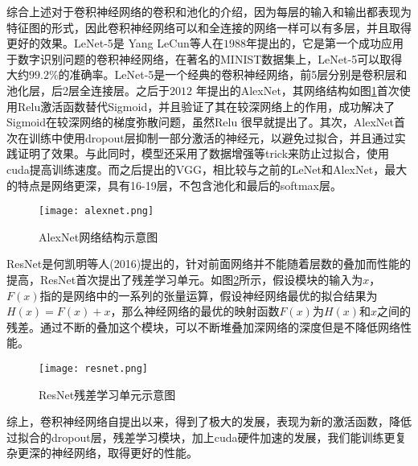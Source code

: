 综合上述对于卷积神经网络的卷积和池化的介绍，因为每层的输入和输出都表现为特征图的形式，因此卷积神经网络可以和全连接的网络一样可以有多层，并且取得更好的效果。LeNet-5\cite{lecun1998gradient-based}是
Yang LeCun等人在$1988$年提出的，它是第一个成功应用于数字识别问题的卷积神经网络，在著名的MINIST数据集上，LeNet-5可以取得大约$99.2\%$的准确率。LeNet-5是一个经典的卷积神经网络，前5层分别是卷积层和池化层，后2层全连接层。之后于$2012$ 年提出的AlexNet\cite{krizhevsky2012imagenet}，其网络结构如图\ref{fig:alexnet-example}首次使用Relu激活函数替代Sigmoid，并且验证了其在较深网络上的作用，成功解决了Sigmoid在较深网络的梯度弥散问题，虽然Relu 很早就提出了。其次，AlexNet首次在训练中使用dropout层抑制一部分激活的神经元，以避免过拟合，并且通过实践证明了效果。与此同时，模型还采用了数据增强等trick来防止过拟合，使用cuda提高训练速度。而之后提出的VGG\cite{simonyan2015very}，相比较与之前的LeNet和AlexNet，最大的特点是网络更深，具有16-19层，不包含池化和最后的softmax层。
\begin{figure}[htpb]
	\centering
	\texttt{[image: alexnet.png]}
    \caption{AlexNet网络结构示意图}
	\vspace*{-3.5mm}
	\label{fig:alexnet-example}
\end{figure}
ResNet\cite{he2016deep}是何凯明等人(2016)提出的，针对前面网络并不能随着层数的叠加而性能的提高，ResNet首次提出了残差学习单元。如图\ref{fig:resnet-example}所示，假设模块的输入为$x$，$F(x)$指的是网络中的一系列的张量运算，假设神经网络最优的拟合结果为$H(x) = F(x) + x$，那么神经网络的最优的映射函数$F(x)$为$H(x)$和$x$之间的残差。通过不断的叠加这个模块，可以不断堆叠加深网络的深度但是不降低网络性能。
\begin{figure}[htpb]
	\centering
	\texttt{[image: resnet.png]}
    \caption{ResNet残差学习单元示意图}
	\vspace*{-3.5mm}
	\label{fig:resnet-example}
\end{figure}

综上，卷积神经网络自提出以来，得到了极大的发展，表现为新的激活函数，降低过拟合的dropout层，残差学习模块，加上cuda硬件加速的发展，我们能训练更复杂更深的神经网络，取得更好的性能。

